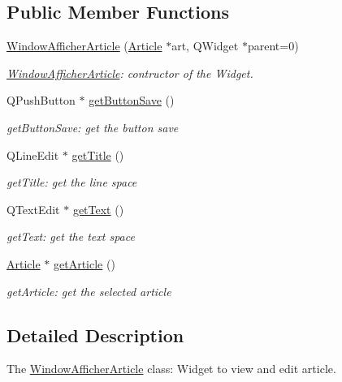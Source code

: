 \subsection*{Public Member Functions}
\begin{DoxyCompactItemize}
\item 
\hyperlink{class_window_afficher_article_afc3f7e8bf71846a8d1cfa881e4d6e9ca}{Window\+Afficher\+Article} (\hyperlink{class_article}{Article} $\ast$art, Q\+Widget $\ast$parent=0)
\begin{DoxyCompactList}\small\item\em \hyperlink{class_window_afficher_article}{Window\+Afficher\+Article}\+: contructor of the Widget. \end{DoxyCompactList}\item 
Q\+Push\+Button $\ast$ \hyperlink{class_window_afficher_article_a7201792ae876ac84e0a3bf20fd3de313}{get\+Button\+Save} ()
\begin{DoxyCompactList}\small\item\em get\+Button\+Save\+: get the button save \end{DoxyCompactList}\item 
Q\+Line\+Edit $\ast$ \hyperlink{class_window_afficher_article_a2ff36b030fe749ea834d9becb15eedea}{get\+Title} ()
\begin{DoxyCompactList}\small\item\em get\+Title\+: get the line space \end{DoxyCompactList}\item 
Q\+Text\+Edit $\ast$ \hyperlink{class_window_afficher_article_a955158e6061fffdceed9f97dee9486f1}{get\+Text} ()
\begin{DoxyCompactList}\small\item\em get\+Text\+: get the text space \end{DoxyCompactList}\item 
\hyperlink{class_article}{Article} $\ast$ \hyperlink{class_window_afficher_article_acc7b1b026331c6b6fe883ae0c3619b9f}{get\+Article} ()
\begin{DoxyCompactList}\small\item\em get\+Article\+: get the selected article \end{DoxyCompactList}\end{DoxyCompactItemize}


\subsection{Detailed Description}
The \hyperlink{class_window_afficher_article}{Window\+Afficher\+Article} class\+: Widget to view and edit article. 

